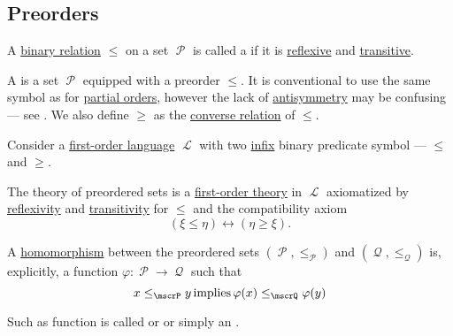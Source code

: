 \subsection{Preorders}\label{subsec:preorders}

\begin{definition}\label{def:preordered_set}
  A \hyperref[def:binary_relation]{binary relation} \( \leq \) on a set \( \mscrP \) is called a  if it is \hyperref[def:binary_relation/reflexive]{reflexive} and \hyperref[def:binary_relation/transitive]{transitive}.

  A  is a set \( \mscrP \) equipped with a preorder \( \leq \). It is conventional to use the same symbol as for \hyperref[def:poset]{partial orders}, however the lack of \hyperref[def:binary_relation/antisymmetric]{antisymmetry} may be confusing --- see . We also define \( \geq \) as the \hyperref[def:binary_relation/converse]{converse relation} of \( \leq \).

  \begin{thmenum}[series=def:preordered_set]
     Consider a \hyperref[def:first_order_language]{first-order language} \( \mscrL \) with two \hyperref[rem:first_order_formula_conventions/infix]{infix} binary predicate symbol --- \( \leq \) and \( \geq \).

    The theory of preordered sets is a \hyperref[def:first_order_theory]{first-order theory} in \( \mscrL \) axiomatized by \hyperref[def:binary_relation/reflexive]{reflexivity} and \hyperref[def:binary_relation/transitive]{transitivity} for \( \leq \) and the compatibility axiom
    \begin{equation}\label{eq:def:preordered_set/theory}
      (\xi \leq \eta) \leftrightarrow (\eta \geq \xi).
    \end{equation}

     A \hyperref[def:first_order_homomorphism]{homomorphism} between the preordered sets \( (\mscrP, \leq_\mscrP) \) and \( (\mscrQ, \leq_\mscrQ) \) is, explicitly, a function \( \varphi: \mscrP \to \mscrQ \) such that
    \begin{equation}\label{eq:def:preordered_set/homomorphism}
      x \leq_\mscrP y \T{implies} \varphi(x) \leq_\mscrQ \varphi(y)
    \end{equation}

    Such as function is called  or  or simply an .


\end{thmenum}
\end{definition}
